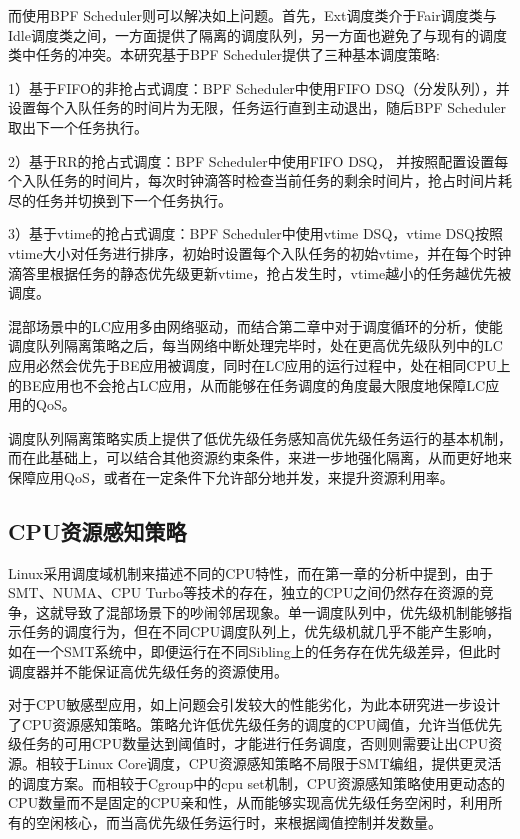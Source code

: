 而使用BPF Scheduler则可以解决如上问题。首先，Ext调度类介于Fair调度类与Idle调度类之间，一方面提供了隔离的调度队列，另一方面也避免了与现有的调度类中任务的冲突。本研究基于BPF Scheduler提供了三种基本调度策略:

1）基于FIFO的非抢占式调度：BPF Scheduler中使用FIFO DSQ（分发队列），并设置每个入队任务的时间片为无限，任务运行直到主动退出，随后BPF Scheduler取出下一个任务执行。

2）基于RR的抢占式调度：BPF Scheduler中使用FIFO DSQ， 并按照配置设置每个入队任务的时间片，每次时钟滴答时检查当前任务的剩余时间片，抢占时间片耗尽的任务并切换到下一个任务执行。

3）基于vtime的抢占式调度：BPF Scheduler中使用vtime DSQ，vtime DSQ按照vtime大小对任务进行排序，初始时设置每个入队任务的初始vtime，并在每个时钟滴答里根据任务的静态优先级更新vtime，抢占发生时，vtime越小的任务越优先被调度。

混部场景中的LC应用多由网络驱动，而结合第二章中对于调度循环的分析，使能调度队列隔离策略之后，每当网络中断处理完毕时，处在更高优先级队列中的LC应用必然会优先于BE应用被调度，同时在LC应用的运行过程中，处在相同CPU上的BE应用也不会抢占LC应用，从而能够在任务调度的角度最大限度地保障LC应用的QoS。

调度队列隔离策略实质上提供了低优先级任务感知高优先级任务运行的基本机制，而在此基础上，可以结合其他资源约束条件，来进一步地强化隔离，从而更好地来保障应用QoS，或者在一定条件下允许部分地并发，来提升资源利用率。

\subsection{CPU资源感知策略}


Linux采用调度域机制来描述不同的CPU特性，而在第一章的分析中提到，由于SMT、NUMA、CPU Turbo等技术的存在，独立的CPU之间仍然存在资源的竞争，这就导致了混部场景下的吵闹邻居现象。单一调度队列中，优先级机制能够指示任务的调度行为，但在不同CPU调度队列上，优先级机就几乎不能产生影响，如在一个SMT系统中，即便运行在不同Sibling上的任务存在优先级差异，但此时调度器并不能保证高优先级任务的资源使用。

对于CPU敏感型应用，如上问题会引发较大的性能劣化，为此本研究进一步设计了CPU资源感知策略。策略允许低优先级任务的调度的CPU阈值，允许当低优先级任务的可用CPU数量达到阈值时，才能进行任务调度，否则则需要让出CPU资源。相较于Linux Core调度，CPU资源感知策略不局限于SMT编组，提供更灵活的调度方案。而相较于Cgroup中的cpu set机制，CPU资源感知策略使用更动态的CPU数量而不是固定的CPU亲和性，从而能够实现高优先级任务空闲时，利用所有的空闲核心，而当高优先级任务运行时，来根据阈值控制并发数量。

